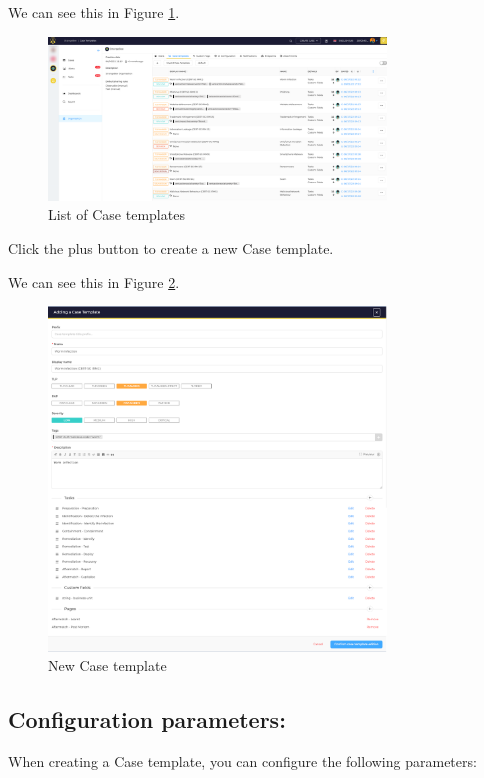 \documentclass{article}
\begin{document}
We can see this in Figure \ref{fig:templetes}.
\begin{figure}[h!]
    \centering
    \includegraphics[width=0.8\textwidth]{organisation-case-templates1.png}
    \caption{List of Case templates}
    \label{fig:templetes}
\end{figure}

Click the plus button to create a new Case template.

We can see this in Figure \ref{fig:new}.
\begin{figure}[h!]
    \centering
    \includegraphics[width=0.8\textwidth]{organisation-case-templates2.png}
    \caption{New Case template}
    \label{fig:new}
\end{figure}

\subsection*{Configuration parameters:}
When creating a Case template, you can configure the following parameters:
\end{document}
